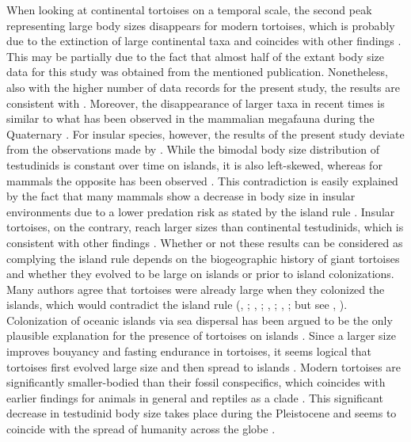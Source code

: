 When looking at continental tortoises on a temporal scale, the second peak representing large body sizes disappears for modern tortoises, which is probably due to the extinction of large continental taxa and coincides with other findings \citep{Itescu2014}. This may be partially due to the fact that almost half of the extant body size data for this study was obtained from the mentioned publication. Nonetheless, also with the higher number of data records for the present study, the results are consistent with \cite{Itescu2014}.
Moreover, the disappearance of larger taxa in recent times is similar to what has been observed in the mammalian megafauna during the Quaternary \citep{Lyons2008}.
For insular species, however, the results of the present study deviate from the observations made by \cite{Lyons2008}. While the bimodal body size distribution of testudinids is constant over time on islands, it is also left-skewed, whereas for mammals the opposite has been observed \citep{Lyons2008}. This contradiction is easily explained by the fact that many mammals show a decrease in body size in insular environments due to a lower predation risk as stated by the island rule \citep{Foster1964}. Insular tortoises, on the contrary, reach larger sizes than continental testudinids, which is consistent with other findings \cite{Itescu2014,Jaffe2011a,Angielczyk2015}.
Whether or not these results can be considered as complying the island rule depends on the biogeographic history of giant tortoises and whether they evolved to be large on islands or prior to island colonizations. Many authors agree that tortoises were already large when they colonized the islands, which would contradict the island rule (\citeauthor{Itescu2014}, \citeyear{Itescu2014}; \citeauthor{Cheke2016}, \citeyear{Cheke2016}; \citeauthor{Gerlach2006}, \citeyear{Gerlach2006}; \citeauthor{Caccone1999}, \citeyear{Caccone1999}; but see \citeauthor{Jaffe2011a}, \citeyear{Jaffe2011a}).
Colonization of oceanic islands via sea dispersal has been argued to be the only plausible explanation for the presence of tortoises on islands \citep{Cheke2016}. Since a larger size improves bouyancy and fasting endurance in tortoises, it seems logical that tortoises first evolved large size and then spread to islands \citep{Patterson1973,Gerlach2006,Cheke2016,Pritchard1996,Jaffe2011a}.
Modern tortoises are significantly smaller-bodied than their fossil conspecifics, which coincides with earlier findings for animals in general \citep{Blackburn1994a} and reptiles as a clade \citep{Smith2016}. This significant decrease in testudinid body size takes place during the Pleistocene and seems to coincide with the spread of humanity across the globe \citep{Rhodin2015}.
